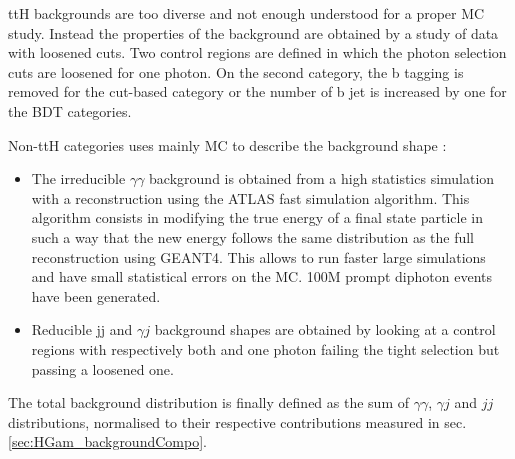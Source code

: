 ttH backgrounds are too diverse and not enough understood for a proper MC study.
Instead the properties of the background are obtained by a study of data with loosened cuts.
Two control regions are defined in which the photon selection cuts are loosened for one photon.
On the second category, the b tagging is removed for the cut-based category or the number of b jet is increased by one for the BDT categories.

Non-ttH categories uses mainly MC to describe the background shape :
\begin{itemize}
\item The irreducible $\gamma \gamma$ background is obtained from a high statistics simulation with a reconstruction using the ATLAS fast simulation algorithm.
This algorithm consists in modifying the true energy of a final state particle in such a way that the new energy follows the same distribution as the full reconstruction using GEANT4.
This allows to run faster large simulations and have small statistical errors on the MC.
100M prompt diphoton events have been generated.

\item Reducible jj and $\gamma j$ background shapes are obtained by looking at a control regions with respectively both and one photon failing the tight selection but passing a loosened one.

\end{itemize}

The total background distribution is finally defined as the sum of $\gamma\gamma$, $\gamma j$ and $jj$  distributions, normalised to their respective contributions measured in sec. \ref{sec:HGam_backgroundCompo}.

